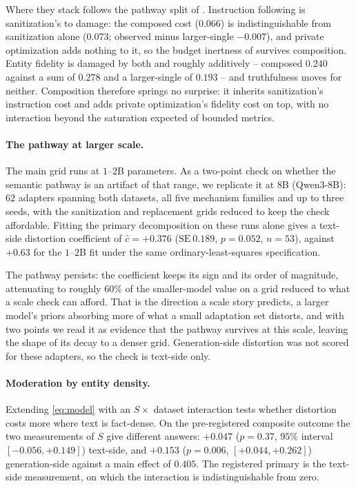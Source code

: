 Where they stack follows the pathway split of .
Instruction following is sanitization's to damage:
the composed cost ($0.066$) is indistinguishable from sanitization alone ($0.073$; observed minus larger-single $-0.007$),
and private optimization adds nothing to it,
so the budget inertness of  survives composition.
Entity fidelity is damaged by both and roughly additively -- composed $0.240$ against a sum of $0.278$ and a larger-single of $0.193$ -- and truthfulness moves for neither.
Composition therefore springs no surprise:
it inherits sanitization's instruction cost and adds private optimization's fidelity cost on top,
with no interaction beyond the saturation expected of bounded metrics.

\paragraph{\label{apx:scale}The pathway at larger scale.}
The main grid runs at $1$--$2$B parameters.
As a two-point check on whether the semantic pathway is an artifact of that range,
we replicate it at $8$B (Qwen3-8B):
$62$ adapters spanning both datasets,
all five mechanism families and up to three seeds,
with the sanitization and replacement grids reduced to keep the check affordable.
Fitting the primary decomposition on these runs alone gives a text-side distortion coefficient of $\hat c = +0.376$ ($\mathrm{SE}\ 0.189$, $p = 0.052$, $n = 53$),
against $+0.63$ for the $1$--$2$B fit under the same ordinary-least-squares specification.

The pathway persists:
the coefficient keeps its sign and its order of magnitude,
attenuating to roughly $60\%$ of the smaller-model value on a grid reduced to what a scale check can afford.
That is the direction a scale story predicts,
a larger model's priors absorbing more of what a small adaptation set distorts,
and with two points we read it as evidence that the pathway survives at this scale,
leaving the shape of its decay to a denser grid.
Generation-side distortion was not scored for these adapters,
so the check is text-side only.

\paragraph{\label{apx:moderation}Moderation by entity density.}
Extending \eqref{eq:model} with an $S \times$ dataset interaction tests whether distortion costs more where text is fact-dense.
On the pre-registered composite outcome the two measurements of $S$ give different answers:
$+0.047$ ($p = 0.37$, $95\%$ interval $[-0.056, +0.149]$) text-side,
and $+0.153$ ($p = 0.006$, $[+0.044, +0.262]$) generation-side against a main effect of $0.405$.
The registered primary is the text-side measurement,
on which the interaction is indistinguishable from zero.

